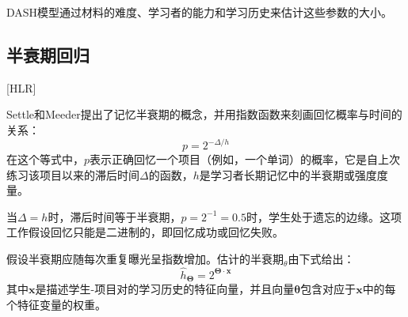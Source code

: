 DASH模型通过材料的难度、学习者的能力和学习历史来估计这些参数的大小\cite{jonesPredictingImprovingMemory2016}。






\subsection{半衰期回归}[HLR]

Settle和Meeder\cite{settlesTrainableSpacedRepetition2016}提出了记忆半衰期的概念，并用指数函数来刻画回忆概率与时间的关系：
\begin{equation}
p = 2^{-\Delta/h}
\end{equation}
在这个等式中，$p$表示正确回忆一个项目（例如，一个单词）的概率，它是自上次练习该项目以来的滞后时间$\Delta$的函数，$h$是学习者长期记忆中的半衰期或强度度量。

当$\Delta=h$时，滞后时间等于半衰期，$p=2^{-1}=0.5$时，学生处于遗忘的边缘。这项工作假设回忆只能是二进制的，即回忆成功或回忆失败。

假设半衰期应随每次重复曝光呈指数增加。估计的半衰期$_\theta$由下式给出：
\begin{equation}
\hat{h}_{\boldsymbol\Theta}=2^{\boldsymbol\Theta \cdot \boldsymbol x}
\end{equation}
其中$\boldsymbol x$是描述学生-项目对的学习历史的特征向量，并且向量$\boldsymbol \theta$包含对应于$\boldsymbol x$中的每个特征变量的权重。

